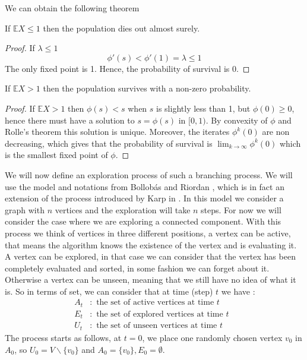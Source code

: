 We can obtain the following theorem
\begin{theorem}
	If $\mathbb{E}X \leq 1$ then the population dies out almost surely.
\end{theorem}
\begin{proof}
    If $\lambda \leq 1$
	\begin{equation}
	    \phi'(s) < \phi'(1) = \lambda \leq 1
	\end{equation}
	The only fixed point is 1. Hence, the probability of survival is 0.
\end{proof}
\begin{theorem}
	If $\mathbb{E}X > 1$ then the population survives with a non-zero probability.
\end{theorem}
\begin{proof}
	If $\mathbb{E}X > 1$ then $\phi(s) < s$ when $s$ is slightly less than 1, but $\phi(0) \geq 0$, hence there must have a solution to $s = \phi(s)$ in $[0,1)$.
	By convexity of $\phi$ and Rolle's theorem this solution is unique.
	Moreover, the iterates $\phi^k(0)$ are non decreasing, which gives that the probability of survival is $\lim_{k \to \infty} \phi^k(0)$ which is the smallest fixed point of $\phi$.
\end{proof}
We will now define an exploration process of such a branching process. We will use the model and notations from Bollob\'as and Riordan \cite{BollobRiordan12}, which is in fact an extension of the process introduced by Karp in \cite{Karp90}.
In this model we consider a graph with $n$ vertices and the exploration will take $n$ steps. 
For now we will consider the case where we are exploring a connected component.
With this process we think of vertices in three different positions, a vertex can be active, that means the algorithm knows the existence of the vertex and is evaluating it.
A vertex can be explored, in that case we can consider that the vertex has been completely evaluated and sorted, in some fashion we can forget about it.
Otherwise a vertex can be unseen, meaning that we still have no idea of what it is.
So in terms of set, we can consider that at time (step) $t$ we have :
\begin{align}
	A_t&: \text{ the set of active vertices at time $t$ } \\
	E_t&: \text{ the set of explored vertices at time $t$ } \\
	U_t&: \text{ the set of unseen vertices at time $t$ } 
\end{align}
The process starts as follows, at $t = 0$, we place one randomly chosen vertex $v_0$ in $A_0$, so $U_0 = V\backslash \{v_0\}$ and $A_0 = \{v_0\}, E_0=\emptyset $.
